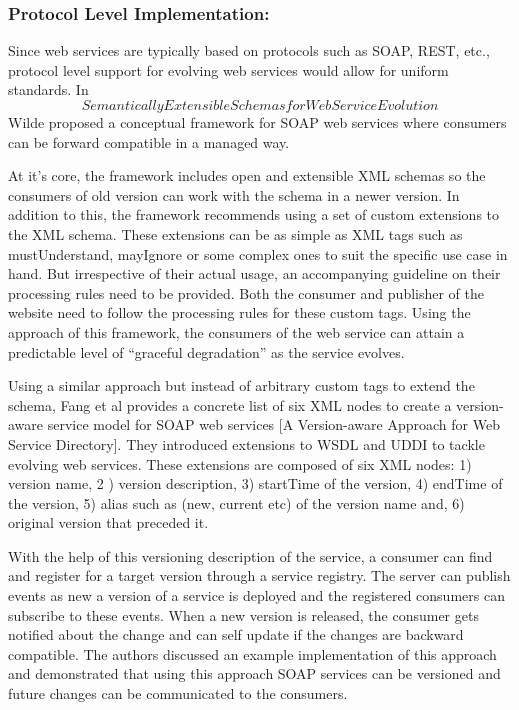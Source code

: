 \documentclass[runningheads,a4paper]{llncs}
\begin{document}
\subsubsection{Protocol Level Implementation:}
Since web services are typically based on protocols such as SOAP, REST, etc., protocol level support for evolving web services would allow for uniform standards. In \[Semantically Extensible Schemas for Web Service Evolution\] Wilde proposed a conceptual framework for SOAP web services where consumers can be forward compatible in a managed way.

At it’s core, the framework includes open and extensible XML schemas so the consumers of old version can work with the schema in a newer version. In addition to this, the framework recommends using a set of custom extensions to the XML schema. These extensions can be as simple as XML tags such as mustUnderstand, mayIgnore or some complex ones to suit the specific use case in hand. But irrespective of their actual usage, an accompanying guideline on their processing rules need to be provided. Both the consumer and publisher of the website need to follow the processing rules for these custom tags. Using the approach of this framework, the consumers of the web service can attain a predictable level of ``graceful degradation'' as the service evolves.

Using a similar approach but instead of arbitrary custom tags to extend the schema, Fang et al provides a concrete list of six XML nodes to create a version-aware service model for SOAP web services [A Version-aware Approach for Web Service Directory]. They introduced extensions to WSDL and UDDI to tackle evolving web services. These extensions are composed of six XML nodes: 1) version name, 2 ) version description, 3) startTime of the version, 4) endTime of the version, 5) alias such as (new, current etc) of the version name and, 6) original version that preceded it.

With the help of this versioning description of the service, a consumer can find and register for a target version through a service registry. The server can publish events as new a version of a service is deployed and the registered consumers can subscribe to these events. When a new version is released, the consumer gets notified about the change and can self update if the changes are backward compatible. The authors discussed an example implementation of this approach and demonstrated that using this approach SOAP services can be versioned and future changes can be communicated to the consumers.
\end{document}
